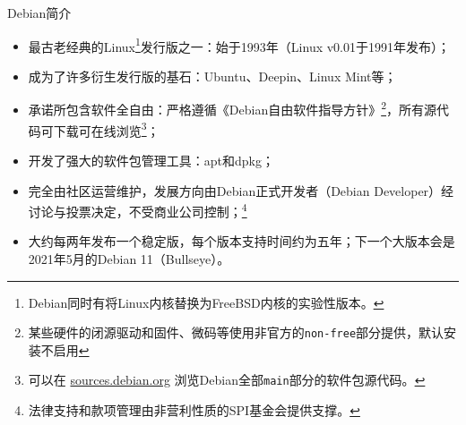
\begin{frame}{Debian简介}
	\begin{itemize}
		\item 最古老经典的Linux\footnote{Debian同时有将Linux内核替换为FreeBSD内核的实验性版本。}发行版之一：始于1993年（Linux v0.01于1991年发布）；
		\item 成为了许多衍生发行版的基石：Ubuntu、Deepin、Linux Mint等；
		\item 承诺所包含软件全自由：严格遵循《Debian自由软件指导方针》\footnote{某些硬件的闭源驱动和固件、微码等使用非官方的\texttt{non-free}部分提供，默认安装不启用}，所有源代码可下载可在线浏览\footnote{可以在 \href{https://sources.debian.org}{sources.debian.org} 浏览Debian全部\texttt{main}部分的软件包源代码。}；
		\item 开发了强大的软件包管理工具：apt和dpkg；
		\item 完全由社区运营维护，发展方向由Debian正式开发者（Debian Developer）经讨论与投票决定，不受商业公司控制；\footnote{法律支持和款项管理由非营利性质的SPI基金会提供支撑。}
		\item 大约每两年发布一个稳定版，每个版本支持时间约为五年；下一个大版本会是2021年5月的Debian 11（Bullseye）。
	\end{itemize}
\end{frame}